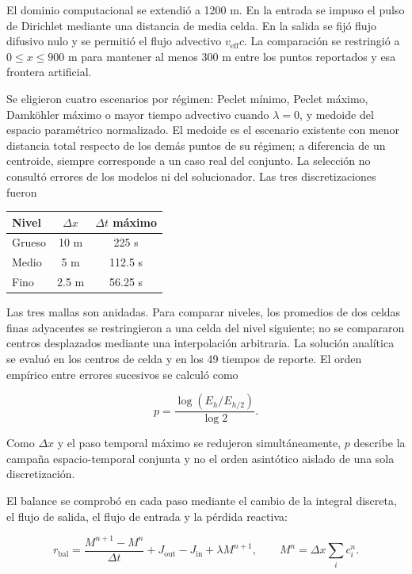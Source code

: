 \documentclass[11pt,a4paper]{article}
\begin{document}
El dominio computacional se extendió a 1200 m. En la entrada se impuso el pulso
de Dirichlet mediante una distancia de media celda. En la salida se fijó flujo
difusivo nulo y se permitió el flujo advectivo $v_{\mathrm{eff}}c$. La
comparación se restringió a $0\leq x\leq900$ m para mantener al menos 300 m
entre los puntos reportados y esa frontera artificial.

Se eligieron cuatro escenarios por régimen: Peclet mínimo, Peclet máximo,
Damköhler máximo o mayor tiempo advectivo cuando $\lambda=0$, y medoide del
espacio paramétrico normalizado. El medoide es el escenario existente con menor
distancia total respecto de los demás puntos de su régimen; a diferencia de un
centroide, siempre corresponde a un caso real del conjunto. La selección no
consultó errores de los modelos ni del solucionador. Las tres discretizaciones
fueron

\begin{center}
\begin{tabular}{@{}lcc@{}}
\toprule
Nivel & $\Delta x$ & $\Delta t$ máximo \\
\midrule
Grueso & 10 m & 225 s \\
Medio & 5 m & 112.5 s \\
Fino & 2.5 m & 56.25 s \\
\bottomrule
\end{tabular}
\end{center}

Las tres mallas son anidadas. Para comparar niveles, los promedios de dos celdas
finas adyacentes se restringieron a una celda del nivel siguiente; no se
compararon centros desplazados mediante una interpolación arbitraria. La
solución analítica se evaluó en los centros de celda y en los 49 tiempos de
reporte. El orden empírico entre errores sucesivos se calculó como

\begin{equation}
p=\frac{\log(E_h/E_{h/2})}{\log 2}.
\label{eq:observed-order}
\end{equation}

Como $\Delta x$ y el paso temporal máximo se redujeron simultáneamente, $p$
describe la campaña espacio-temporal conjunta y no el orden asintótico aislado
de una sola discretización.

El balance se comprobó en cada paso mediante el cambio de la integral discreta,
el flujo de salida, el flujo de entrada y la pérdida reactiva:

\begin{equation}
r_{\mathrm{bal}}=
\frac{M^{n+1}-M^n}{\Delta t}
+J_{\mathrm{out}}-J_{\mathrm{in}}+\lambda M^{n+1},
\qquad M^n=\Delta x\sum_i c_i^n.
\label{eq:mass-balance}
\end{equation}
\end{document}
